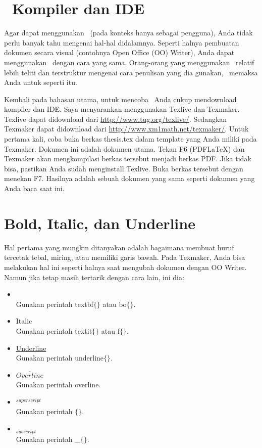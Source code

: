 \section{\latex~Kompiler dan IDE}
Agar dapat menggunakan \latex~(pada konteks hanya sebagai pengguna), Anda 
tidak perlu banyak tahu mengenai hal-hal didalamnya. 
Seperti halnya pembuatan dokumen secara visual (contohnya Open Office (OO) 
Writer), Anda dapat menggunakan \latex~dengan cara yang sama. 
Orang-orang yang menggunakan \latex~relatif lebih teliti dan terstruktur 
mengenai cara penulisan yang dia gunakan, \latex~memaksa Anda untuk seperti 
itu.  

Kembali pada bahasan utama, untuk mencoba \latex~Anda cukup mendownload 
kompiler dan IDE. Saya menyarankan menggunakan Texlive dan Texmaker. 
Texlive dapat didownload dari \url{http://www.tug.org/texlive/}. 
Sedangkan Texmaker dapat didownload dari 
\url{http://www.xm1math.net/texmaker/}. 
Untuk pertama kali, coba buka berkas thesis.tex dalam template yang Anda miliki 
pada Texmaker. 
Dokumen ini adalah dokumen utama. 
Tekan F6 (PDFLaTeX) dan Texmaker akan mengkompilasi berkas tersebut menjadi 
berkas PDF. 
Jika tidak bisa, pastikan Anda sudah menginstall Texlive. 
Buka berkas tersebut dengan menekan F7. 
Hasilnya adalah sebuah dokumen yang sama seperti dokumen yang Anda baca saat 
ini. 


\section{Bold, Italic, dan Underline}
Hal pertama yang mungkin ditanyakan adalah bagaimana membuat huruf tercetak 
tebal, miring, atau memiliki garis bawah. 
Pada Texmaker, Anda bisa melakukan hal ini seperti halnya saat mengubah dokumen 
dengan OO Writer. 
Namun jika tetap masih tertarik dengan cara lain, ini dia: 

\begin{itemize}
	\item {} \\
		Gunakan perintah \bslash textbf$\lbrace\rbrace$ atau 
		\bslash bo$\lbrace\rbrace$. 
	\item \f{Italic} \\
		Gunakan perintah \bslash textit$\lbrace\rbrace$ atau 
		\bslash f$\lbrace\rbrace$. 
	\item \underline{Underline} \\
		Gunakan perintah \bslash underline$\lbrace\rbrace$.
	\item $\overline{Overline}$ \\
		Gunakan perintah \bslash overline. 
	\item $^{superscript}$ \\
		Gunakan perintah \bslash $\lbrace\rbrace$. 
	\item $_{subscript}$ \\
		Gunakan perintah \bslash \_$\lbrace\rbrace$. 
\end{itemize}

